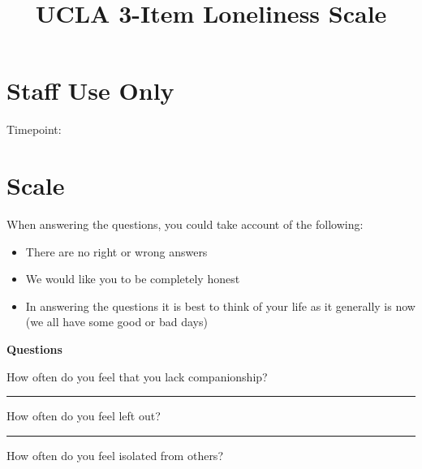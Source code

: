 \documentclass[
  english,
  a4paper,
  sdaps_style=qr,
  checkmode= check
]{sdapsclassic}
\title{UCLA 3-Item Loneliness Scale}
\author{}
\date{}
\begin{document}
\begin{questionnaire}[noinfo]

\section{Staff Use Only}
    \begin{optionquestion}[cols=3, var=timepoint]{Timepoint:}
    \end{optionquestion}

\section{Scale}
When answering the questions, you could take account of the following: 
\begin{itemize}
    \item There are no right or wrong answers
    \item We would like you to be completely honest
    \item In answering the questions it is best to think of your life as it generally is now \\(we all have some good or bad days)
\end{itemize}

\vspace{0.5em}

\textbf{Questions}
\begin{optionquestion}[cols=1, singlechoice, var=ucla01]{How often do you feel that you lack companionship?}
\end{optionquestion}

\rule{\linewidth}{1pt}

\begin{optionquestion}[cols=1, singlechoice, var=ucla02]{How often do you feel left out?}
\end{optionquestion}

\rule{\linewidth}{1pt}

\begin{optionquestion}[cols=1, singlechoice, var=ucla03]{How often do you feel isolated from others?}
\end{optionquestion}
\end{questionnaire}
\end{document}
